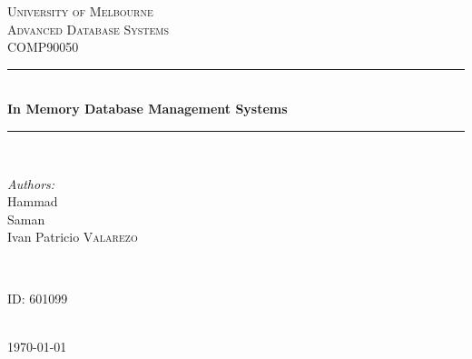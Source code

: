 \documentclass[10pt]{article} %
\begin{document}

\begin{titlepage}

\newcommand{\HRule}{\rule{\linewidth}{0.5mm}} %

\center %

\textsc{\LARGE University of Melbourne}\\[1.5cm] %
\textsc{\Large Advanced Database Systems}\\[0.5cm] %
\textsc{\large COMP90050}\\[0.5cm] %

\HRule \\[0.4cm]
{ \huge \bfseries In Memory Database Management Systems}\\[0.4cm] %
\HRule \\[1.5cm]

\begin{minipage}{0.4\textwidth}
\begin{flushleft} \large
\emph{Authors:}\\
Hammad \\
Saman \\
Ivan Patricio \textsc{Valarezo}\\ %
\end{flushleft}
\end{minipage}
~
\begin{minipage}{0.4\textwidth}
\begin{flushright} \large
ID: \textsc{601099} %
\end{flushright}
\end{minipage}\\[4cm]

{\large \today}\\[3cm] %


\vfill %

\end{titlepage}
\end{document}
